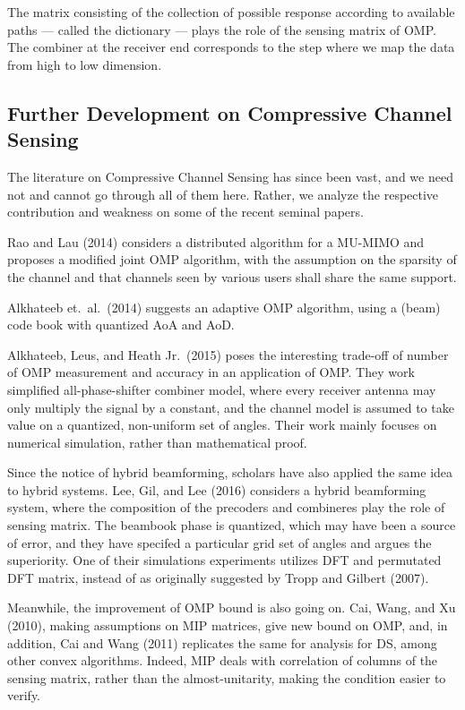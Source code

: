 The matrix consisting of the collection of possible response according to available paths --- called the dictionary --- plays the role of the sensing matrix of OMP.
The combiner at the receiver end corresponds to the step where we map the data from high to low dimension.

\subsection{Further Development on Compressive Channel Sensing}

The literature on Compressive Channel Sensing has since been vast, and we need not and cannot go through all of them here.
Rather, we analyze the respective contribution and weakness on some of the recent seminal papers.

Rao and Lau (2014) considers a distributed algorithm for a MU-MIMO and proposes a modified joint OMP algorithm, with the assumption on the sparsity of the channel and that channels seen by various users shall share the same support.

Alkhateeb et.\ al.\ (2014) suggests an adaptive OMP algorithm, using a (beam) code book with quantized AoA and AoD.

Alkhateeb, Leus, and Heath Jr.\ (2015) poses the interesting trade-off of number of OMP measurement and accuracy in an application of OMP.
They work simplified all-phase-shifter combiner model, where every receiver antenna may only multiply the signal by a constant, and the channel model is assumed to take value on a quantized, non-uniform set of angles.
Their work mainly focuses on numerical simulation, rather than mathematical proof.

Since the notice of hybrid beamforming, scholars have also applied the same idea to hybrid systems.
Lee, Gil, and Lee (2016) considers a hybrid beamforming system, where the composition of the precoders and combineres play the role of sensing matrix.
The beambook phase is quantized, which may have been a source of error, and they have specifed a particular grid set of angles and argues the superiority.
One of their simulations experiments utilizes DFT and permutated DFT matrix, instead of as originally suggested by Tropp and Gilbert (2007).

Meanwhile, the improvement of OMP bound is also going on.
Cai, Wang, and Xu (2010), making assumptions on MIP matrices, give new bound on OMP, and, in addition, Cai and Wang (2011) replicates the same for analysis for DS, among other convex algorithms.
Indeed, MIP deals with correlation of columns of the sensing matrix, rather than the almost-unitarity, making the condition easier to verify.

